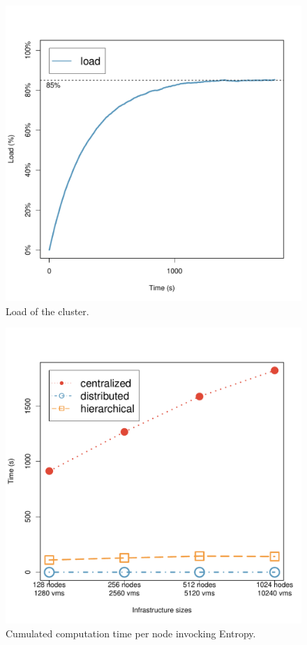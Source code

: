 \begin{figure}[ht]
\begin{center}
    \includegraphics[width=.65\linewidth]{figures/experiments/1024-hierarchical.pdf}
    \caption{Load of the cluster.}
\end{center}
\label{fig:experiments_1024_hierarchical}
\end{figure}


\begin{figure}[ht]
\begin{center}
    \includegraphics[width=.65\linewidth]{figures/experiments/compute_time_per_service_node.pdf}
    \caption{Cumulated computation time per node invocking Entropy.}
\end{center}
\label{fig:experiments_compute_time_per_service_node}
\end{figure}

